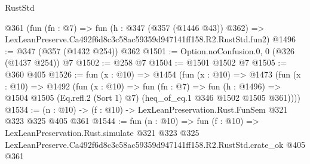 \begin{lexlean}{RustStd}
\begin{coremodule}
    @361
    (fun (fn : @7) =>
    fun (h : @347 (@357 (@1446 @43)) @362) =>
    LexLeanPreserve.Ca492f6d8c3c58ac59359d947141ff158.R2.RustStd.fun2)
@1496 := @347 (@357 (@1432 @254)) @362
@1501 := Option.noConfusion.{0, 0} (@326 (@1437 @254)) @7
@1502 := @258 @7
@1504 := @1501 @1502 @7
@1505 := @360 @405
@1526 := fun (x : @10) =>
  @1454
    (fun (x : @10) =>
    @1473
      (fun (x : @10) =>
      @1492
        (fun (x : @10) =>
        fun (fn : @7) =>
        fun (h : @1496) =>
        @1504 @1505 (Eq.refl.{2} (Sort 1) @7) (heq_of_eq.{1} @346 @1502 @1505 @361))))
@1534 := (n : @10) -> (f : @10) -> LexLeanPreservation.Rust.FunSem @321 @323 @325 @405 @361
@1544 := fun (n : @10) =>
  fun (f : @10) =>
  LexLeanPreservation.Rust.simulate
    @321
    @323
    @325
    LexLeanPreserve.Ca492f6d8c3c58ac59359d947141ff158.R2.RustStd.crate_ok
    @405
    @361
\end{coremodule}
\end{lexlean}

